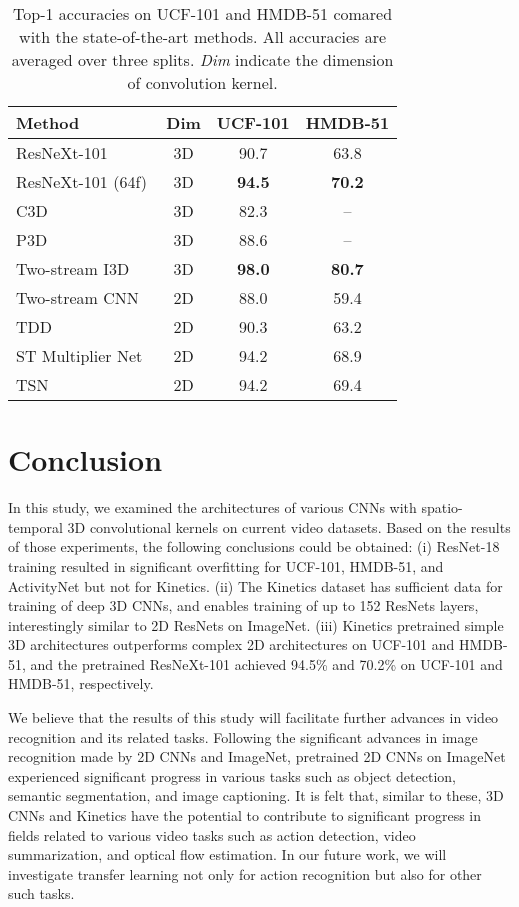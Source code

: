\documentclass[10pt,twocolumn,letterpaper]{article}
\begin{document}
    \begin{table}[t]
      \centering
      \caption{
        Top-1 accuracies on UCF-101 and HMDB-51 comared with the state-of-the-art methods.
        All accuracies are averaged over three splits.
        \textit{Dim} indicate the dimension of convolution kernel.
      }\label{tbl:ucf101_hmdb51_sota}
      \begin{tabular}{lccc}
        \toprule
        Method & Dim & UCF-101 & HMDB-51 \\
        \midrule
        ResNeXt-101 & 3D & 90.7 & 63.8 \\
        ResNeXt-101 (64f) & 3D & \textbf{94.5} & \textbf{70.2} \\
        \midrule
        C3D~\cite{C3D} & 3D & 82.3 & -- \\
        P3D~\cite{Qiu_2017_ICCV} & 3D & 88.6 & -- \\
        Two-stream I3D~\cite{I3D_arxiv} & 3D & \textbf{98.0} & \textbf{80.7} \\
        \midrule
        Two-stream CNN~\cite{Simonyan2014} & 2D & 88.0 & 59.4 \\
        TDD~\cite{Wang2015TDD} & 2D & 90.3 & 63.2 \\
        ST Multiplier Net~\cite{feichtenhofer2017multiplier} & 2D & 94.2 & 68.9 \\
        TSN~\cite{Wang2016TSN} & 2D & 94.2 & 69.4 \\
        \bottomrule
      \end{tabular}
    \end{table}

\section{Conclusion}
  In this study, we examined the architectures of various CNNs with spatio-temporal 3D convolutional kernels on current video datasets.
  Based on the results of those experiments, the following conclusions could be obtained:
  (i) ResNet-18 training resulted in significant overfitting for UCF-101, HMDB-51, and ActivityNet but not for Kinetics.
  (ii) The Kinetics dataset has sufficient data for training of deep 3D CNNs,
  and enables training of up to 152 ResNets layers, interestingly similar to 2D ResNets on ImageNet.
  (iii) Kinetics pretrained simple 3D architectures outperforms complex 2D architectures on UCF-101 and HMDB-51,
  and the pretrained ResNeXt-101 achieved 94.5\% and 70.2\% on UCF-101 and HMDB-51, respectively.

  We believe that the results of this study will facilitate further advances in video recognition and its related tasks.
  Following the significant advances in image recognition made by 2D CNNs and ImageNet,
  pretrained 2D CNNs on ImageNet experienced significant progress in various tasks
  such as object detection, semantic segmentation, and image captioning.
  It is felt that, similar to these,
  3D CNNs and Kinetics have the potential to contribute to significant progress in fields related to various video tasks
  such as action detection, video summarization, and optical flow estimation.
  In our future work, we will investigate transfer learning not only for action recognition but also for other such tasks.
\end{document}
